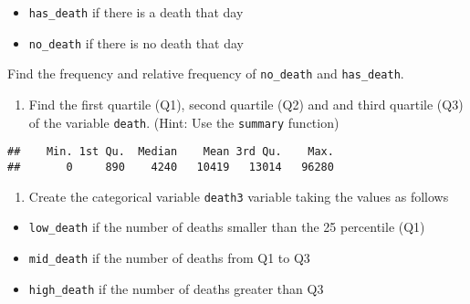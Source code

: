 \documentclass[
]{article}
\newenvironment{Shaded}{\begin{snugshade}}{\end{snugshade}}
\newcommand{\FunctionTok}[1]{\textcolor[rgb]{0.00,0.00,0.00}{#1}}
\newcommand{\NormalTok}[1]{#1}
\newcommand{\SpecialCharTok}[1]{\textcolor[rgb]{0.00,0.00,0.00}{#1}}
\providecommand{\tightlist}{%
  \setlength{\itemsep}{0pt}\setlength{\parskip}{0pt}}
\begin{document}
\begin{itemize}
\tightlist
\item
  \texttt{has\_death} if there is a death that day
\item
  \texttt{no\_death} if there is no death that day
\end{itemize}

Find the frequency and relative frequency of \texttt{no\_death} and
\texttt{has\_death}.

\begin{enumerate}
\def\labelenumi{\arabic{enumi}.}
\setcounter{enumi}{10}
\tightlist
\item
  Find the first quartile (Q1), second quartile (Q2) and and third
  quartile (Q3) of the variable \texttt{death}. (Hint: Use the
  \texttt{summary} function)
\end{enumerate}

\begin{Shaded}
\end{Shaded}

\begin{verbatim}
##    Min. 1st Qu.  Median    Mean 3rd Qu.    Max. 
##       0     890    4240   10419   13014   96280
\end{verbatim}

\begin{enumerate}
\def\labelenumi{\arabic{enumi}.}
\setcounter{enumi}{11}
\tightlist
\item
  Create the categorical variable \texttt{death3} variable taking the
  values as follows
\end{enumerate}

\begin{itemize}
\item
  \texttt{low\_death} if the number of deaths smaller than the 25
  percentile (Q1)
\item
  \texttt{mid\_death} if the number of deaths from Q1 to Q3
\item
  \texttt{high\_death} if the number of deaths greater than Q3
\end{itemize}
\end{document}
